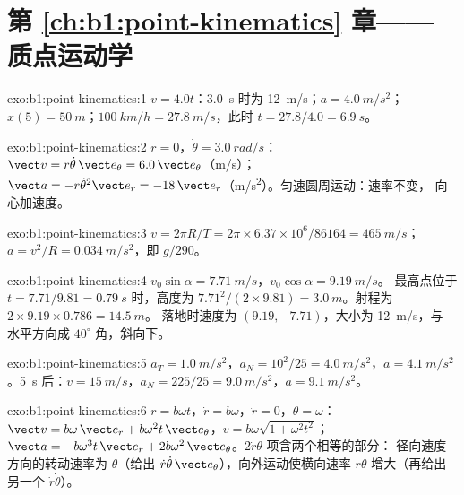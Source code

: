 \section*{第 \ref{ch:b1:point-kinematics} 章——质点运动学}

\begin{solution}{exo:b1:point-kinematics:1}
$v = 4.0t$：\qty{3.0}{s} 时为 \qty{12}{m/s}；$a = \qty{4.0}{m/s^2}$；
$x(5) = \qty{50}{m}$；$\qty{100}{km/h} = \qty{27.8}{m/s}$，此时 $t = 27.8/4.0
= \qty{6.9}{s}$。
\end{solution}

\begin{solution}{exo:b1:point-kinematics:2}
$\dot r = 0$，$\dot\theta = \qty{3.0}{rad/s}$：$\vect v = r\dot\theta\,\vect e_\theta
= 6.0\,\vect e_\theta$（\unit{m/s}）；$\vect a = -r\dot\theta^2\vect e_r =
-18\,\vect e_r$（\unit{m/s^2}）。匀速圆周运动：速率不变，
向心加速度。
\end{solution}

\begin{solution}{exo:b1:point-kinematics:3}
$v = 2\pi R/T = 2\pi \times 6.37\times10^6/86164 = \qty{465}{m/s}$；
$a = v^2/R = \qty{0.034}{m/s^2}$，即 $g/290$。
\end{solution}

\begin{solution}{exo:b1:point-kinematics:4}
$v_0\sin\alpha = \qty{7.71}{m/s}$，$v_0\cos\alpha = \qty{9.19}{m/s}$。
最高点位于 $t = 7.71/9.81 = \qty{0.79}{s}$ 时，高度为 $7.71^2/(2 \times 9.81) =
\qty{3.0}{m}$。射程为 $2 \times 9.19 \times 0.786 = \qty{14.5}{m}$。
落地时速度为 $(9.19, -7.71)$，大小为 \qty{12}{m/s}，与
水平方向成 $40^\circ$ 角，斜向下。
\end{solution}

\begin{solution}{exo:b1:point-kinematics:5}
$a_T = \qty{1.0}{m/s^2}$，$a_N = 10^2/25 = \qty{4.0}{m/s^2}$，$a =
\qty{4.1}{m/s^2}$。\qty{5}{s} 后：$v = \qty{15}{m/s}$，$a_N = 225/25 =
\qty{9.0}{m/s^2}$，$a = \qty{9.1}{m/s^2}$。
\end{solution}

\begin{solution}{exo:b1:point-kinematics:6}
$r = b\omega t$，$\dot r = b\omega$，$\ddot r = 0$，$\dot\theta = \omega$：
$\vect v = b\omega\,\vect e_r + b\omega^2 t\,\vect e_\theta$，$v = b\omega
\sqrt{1 + \omega^2t^2}$；$\vect a = -b\omega^3 t\,\vect e_r + 2b\omega^2\,
\vect e_\theta$。$2\dot r\dot\theta$ 项含两个相等的部分：
径向速度方向的转动速率为 $\dot\theta$（给出
$\dot r\dot\theta\,\vect e_\theta$），向外运动使横向速率 $r\dot\theta$ 增大（再给出
另一个 $\dot r\dot\theta$）。
\end{solution}


